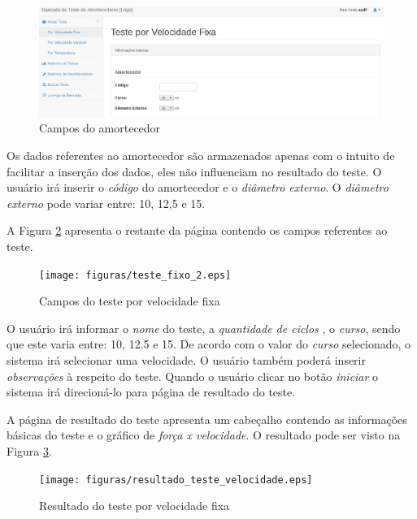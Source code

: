 \begin{figure}[h]
	\centering
	\label{img:teste_fixo_um}
		\includegraphics[width=1\textwidth]{figuras/teste_fixo_1.eps}
	\caption{Campos do amortecedor}
\end{figure}

Os dados referentes ao amortecedor são armazenados apenas com o intuito de facilitar a inserção dos dados, eles não influenciam no resultado do teste. O usuário irá inserir o \textit{código} do amortecedor e o \textit{diâmetro externo}. O  \textit{diâmetro externo} pode variar entre: 10, 12,5 e 15.

A Figura \ref{img:teste_fixo_dois} apresenta o restante da página contendo os campos referentes ao teste. 

\begin{figure}[h]
	\centering
	\label{img:teste_fixo_dois}
		\texttt{[image: figuras/teste\_fixo\_2.eps]}
	\caption{Campos do teste por velocidade fixa}
\end{figure}

O usuário irá informar o \textit{nome} do teste, a \textit{quantidade de ciclos }, o \textit{curso}, sendo que este varia entre: 10, 12.5 e 15. De acordo com o valor do \textit{curso} selecionado, o sistema irá selecionar uma velocidade. O usuário também poderá inserir \textit{observações} à respeito do teste. Quando o usuário clicar no botão \textit{iniciar} o sistema irá direcioná-lo para página de resultado do teste. 

A página de resultado do teste apresenta um cabeçalho contendo as informações básicas do teste e o gráfico de \textit{força x velocidade}. O resultado pode ser visto na Figura \ref{img:resultado}.

\begin{figure}[h]
	\centering
	\label{img:resultado}
		\texttt{[image: figuras/resultado\_teste\_velocidade.eps]}
	\caption{Resultado do teste por velocidade fixa}
\end{figure}
